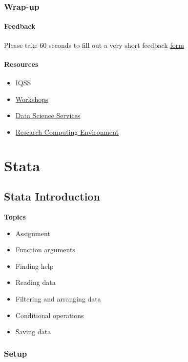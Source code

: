 \documentclass[]{book}
\providecommand{\tightlist}{%
  \setlength{\itemsep}{0pt}\setlength{\parskip}{0pt}}
\begin{document}
\section{Wrap-up}\label{wrap-up-5}

\subsection{Feedback}\label{feedback-5}

Please take 60 seconds to fill out a very short feedback
\href{http://bit.ly/training_class_eval}{form}

\subsection{Resources}\label{resources-5}

\begin{itemize}
\tightlist
\item
  IQSS
\item
  \href{https://dss.iq.harvard.edu/workshop-materials}{Workshops}
\item
  \href{https://dss.iq.harvard.edu/}{Data Science Services}
\item
  \href{https://iqss.github.io/dss-rce/}{Research Computing Environment}
\end{itemize}

\part{Stata}\label{part-stata}

\chapter{Stata Introduction}\label{stata-introduction}

\textbf{Topics}

\begin{itemize}
\tightlist
\item
  Assignment
\item
  Function arguments
\item
  Finding help
\item
  Reading data
\item
  Filtering and arranging data
\item
  Conditional operations
\item
  Saving data
\end{itemize}

\section{Setup}\label{setup-6}
\end{document}

